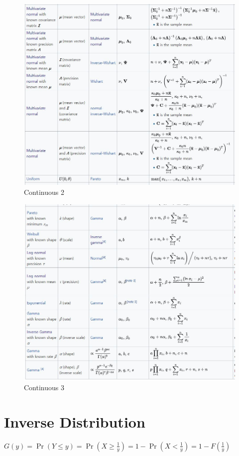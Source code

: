 \documentclass[11pt]{article}
\begin{document}
\begin{figure}[htbp]
\begin{center}
    \includegraphics[scale=0.8]{Con2}
    \caption{Continuous 2} \label{fig:label}
\end{center}
\end{figure}

\begin{figure}[htbp]
\begin{center}
    \includegraphics[scale=0.8]{Con3}
    \caption{Continuous 3} \label{fig:label}
\end{center}
\end{figure}

\section{Inverse Distribution} 
$G(y)=\Pr(Y\leq y)=\Pr \left(X\geq {\frac {1}{y}}\right)=1-\Pr \left(X<{\frac {1}{y}}\right)=1-F\left({\frac {1}{y}}\right)$
\end{document}
